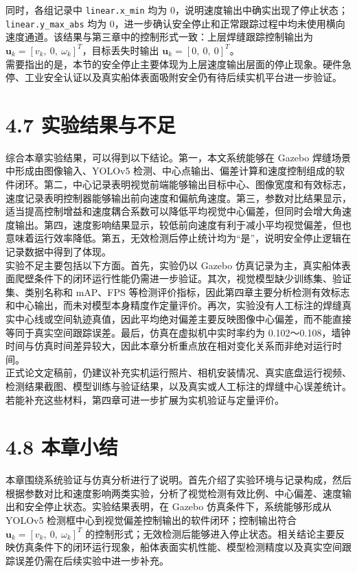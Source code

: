 \documentclass[UTF8,a4paper,12pt]{ctexrep}
\begin{document}
同时，各组记录中 \texttt{linear.x\_min} 均为 0，说明速度输出中确实出现了停止状态；\texttt{linear.y\_max\_abs} 均为 0，进一步确认安全停止和正常跟踪过程中均未使用横向速度通道。该结果与第三章中的控制形式一致：上层焊缝跟踪控制输出为 $\mathbf{u}_k=[v_k,\ 0,\ \omega_k]^T$，目标丢失时输出 $\mathbf{u}_k=[0,\ 0,\ 0]^T$。\\

需要指出的是，本节的安全停止主要体现为上层速度输出层面的停止现象。硬件急停、工业安全认证以及真实船体表面吸附安全仍有待后续实机平台进一步验证。\\

\section{4.7 实验结果与不足}

综合本章实验结果，可以得到以下结论。第一，本文系统能够在 Gazebo 焊缝场景中形成由图像输入、YOLOv5 检测、中心点输出、偏差计算和速度控制组成的软件闭环。第二，中心记录表明视觉前端能够输出目标中心、图像宽度和有效标志，速度记录表明控制器能够输出前向速度和偏航角速度。第三，参数对比结果显示，适当提高控制增益和速度耦合系数可以降低平均视觉中心偏差，但同时会增大角速度输出。第四，速度影响结果显示，较低前向速度有利于减小平均视觉偏差，但也意味着运行效率降低。第五，无效检测后停止统计均为“是”，说明安全停止逻辑在记录数据中得到了体现。\\

实验不足主要包括以下方面。首先，实验仍以 Gazebo 仿真记录为主，真实船体表面爬壁条件下的闭环运行性能仍需进一步验证。其次，视觉模型缺少训练集、验证集、类别名称和 mAP、FPS 等检测评价指标，因此第四章主要分析检测有效标志和中心输出，而未对模型本身精度作定量评价。再次，实验没有人工标注的焊缝真实中心线或空间轨迹真值，因此平均绝对偏差主要反映图像中心偏差，而不能直接等同于真实空间跟踪误差。最后，仿真在虚拟机中实时率约为 0.102～0.108，墙钟时间与仿真时间差异较大，因此本章分析重点放在相对变化关系而非绝对运行时间。\\

正式论文定稿前，仍建议补充实机运行照片、相机安装情况、真实底盘运行视频、检测结果截图、模型训练与验证结果，以及真实或人工标注的焊缝中心误差统计。若能补充这些材料，第四章可进一步扩展为实机验证与定量评价。\\

\section{4.8 本章小结}

本章围绕系统验证与仿真分析进行了说明。首先介绍了实验环境与记录构成，然后根据参数对比和速度影响两类实验，分析了视觉检测有效比例、中心偏差、速度输出和安全停止状态。实验结果表明，在 Gazebo 仿真条件下，系统能够形成从 YOLOv5 检测框中心到视觉偏差控制输出的软件闭环；控制输出符合 $\mathbf{u}_k=[v_k,\ 0,\ \omega_k]^T$ 的控制形式；无效检测后能够进入停止状态。相关结论主要反映仿真条件下的闭环运行现象，船体表面实机性能、模型检测精度以及真实空间跟踪误差仍需在后续实验中进一步补充。\\
\end{document}
